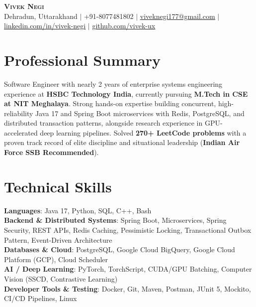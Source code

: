\documentclass[letterpaper,10pt]{article}
\begin{document}
\begin{center}
    \textbf{\Huge \scshape Vivek Negi} \\ \vspace{2pt}
    \small Dehradun, Uttarakhand $|$ +91-8077481802 $|$ \href{mailto:viveknegi177@gmail.com}{\underline{viveknegi177@gmail.com}} $|$ 
    \href{https://linkedin.com/in/vivek-negi-b46070222}{\underline{linkedin.com/in/vivek-negi}} $|$
    \href{https://github.com/vivek-ux}{\underline{github.com/vivek-ux}}
\end{center}

\section{Professional Summary}
\small{
Software Engineer with nearly 2 years of enterprise systems engineering experience at \textbf{HSBC Technology India}, currently pursuing \textbf{M.Tech in CSE at NIT Meghalaya}. Strong hands-on expertise building concurrent, high-reliability Java 17 and Spring Boot microservices with Redis, PostgreSQL, and distributed transaction patterns, alongside research experience in GPU-accelerated deep learning pipelines. Solved \textbf{270+ LeetCode problems} with a proven track record of elite discipline and situational leadership (\textbf{Indian Air Force SSB Recommended}).
}

\section{Technical Skills}
 \begin{itemize}[leftmargin=0.15in, label={}]
    \small{\item{
     \textbf{Languages}{: Java 17, Python, SQL, C++, Bash} \\
     \textbf{Backend \& Distributed Systems}{: Spring Boot, Microservices, Spring Security, REST APIs, Redis Caching, Pessimistic Locking, Transactional Outbox Pattern, Event-Driven Architecture} \\
     \textbf{Databases \& Cloud}{: PostgreSQL, Google Cloud BigQuery, Google Cloud Platform (GCP), Cloud Scheduler} \\
     \textbf{AI / Deep Learning}{: PyTorch, TorchScript, CUDA/GPU Batching, Computer Vision (SSCD, Contrastive Learning)} \\
     \textbf{Developer Tools \& Testing}{: Docker, Git, Maven, Postman, JUnit 5, Mockito, CI/CD Pipelines, Linux}
    }}
 \end{itemize}
\end{document}
